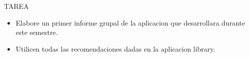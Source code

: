 TAREA
\begin{itemize}		
	\item Elabore un primer informe grupal de la aplicacion que desarrollara durante este semestre.
	\item Utilicen todas las recomendaciones dadas en la aplicacion library.
\end{itemize}
